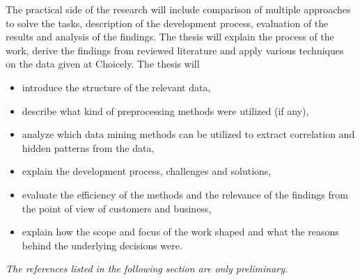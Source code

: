 \documentclass[english]{../tktltiki}
\begin{document}
	\pagebreak
	The practical side of the research will include comparison of multiple approaches to solve the tasks, description of the development process, evaluation of the results and analysis of the findings. The thesis will explain the process of the work, derive the findings from reviewed literature and apply various techniques on the data given at Choicely. The thesis will  

\begin{itemize}
    \item introduce the structure of the relevant data,
    \item describe what kind of preprocessing methods were utilized (if any),
    \item analyze which data mining methods can be utilized to extract correlation and hidden patterns from the data, 
    \item explain the development process, challenges and solutions,
    \item evaluate the efficiency of the methods and the relevance of the findings from the point of view of customers and business, 
    \item explain how the scope and focus of the work shaped and what the reasons behind the underlying decisions were.
\end{itemize}

\textit{The references listed in the following section are only preliminary.}
    
\nocite{*}



\lastpage

\appendices

\pagestyle{empty}

%
%
\end{document}
